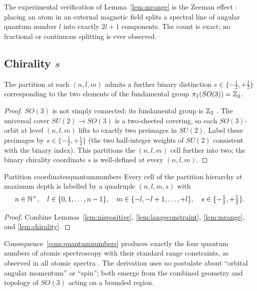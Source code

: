 \begin{remark}
The experimental verification of Lemma~\ref{lem:mrange} is the Zeeman effect \citep{zeeman1897}: placing an atom in an external magnetic field splits a spectral line of angular quantum number $l$ into exactly $2l+1$ components. The count is exact; no fractional or continuous splitting is ever observed.
\end{remark}

\subsection{Chirality $s$}

\begin{lemma}
\label{lem:chirality}
The partition at each $(n,l,m)$ admits a further binary distinction $s\in\{-\tfrac12,+\tfrac12\}$ corresponding to the two elements of the fundamental group $\pi_{1}(SO(3))=\mathbb{Z}_{2}$.
\end{lemma}
\begin{proof}
$SO(3)$ is not simply connected; its fundamental group is $\mathbb{Z}_{2}$ \citep{nakahara2003}. The universal cover $SU(2)\to SO(3)$ is a two-sheeted covering, so each $SO(3)$-orbit at level $(n,l,m)$ lifts to exactly two preimages in $SU(2)$. Label these preimages by $s\in\{-\tfrac12,+\tfrac12\}$ (the two half-integer weights of $SU(2)$ consistent with the binary index). This partitions the $(n,l,m)$ cell further into two; the binary chirality coordinate $s$ is well-defined at every $(n,l,m)$.
\end{proof}

\begin{consequence}{Partition coordinates}{quantumnumbers}
Every cell of the partition hierarchy at maximum depth is labelled by a quadruple $(n,l,m,s)$ with
\begin{equation}
n\in\mathbb{N}^{+},\quad l\in\{0,1,\ldots,n-1\},\quad m\in\{-l,-l+1,\ldots,+l\},\quad s\in\{-\tfrac12,+\tfrac12\}.
\label{eq:nlms}
\end{equation}
\end{consequence}

\begin{proof}
Combine Lemmas~\ref{lem:nispositive}, \ref{lem:langeconstraint}, \ref{lem:mrange}, and \ref{lem:chirality}.
\end{proof}

\begin{remark}
Consequence~\ref{cons:quantumnumbers} produces exactly the four quantum numbers of atomic spectroscopy with their standard range constraints, as observed in all atomic spectra \citep{herzberg1944,nistasd}. The derivation uses no postulate about ``orbital angular momentum'' or ``spin''; both emerge from the combined geometry and topology of $SO(3)$ acting on a bounded region.
\end{remark}

